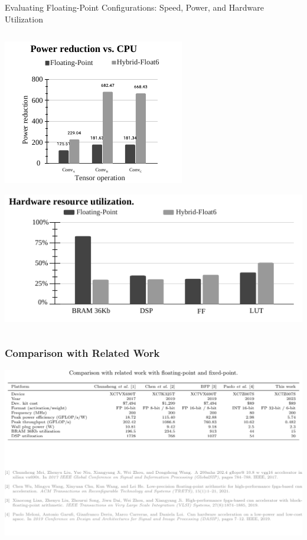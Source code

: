 \begin{frame}{Evaluating Floating-Point Configurations: Speed, Power, and Hardware Utilization}
\begin{columns}[T]
\begin{column}{0.5\textwidth}
			\includegraphics[width=0.5\linewidth]{slides/figures/power_reduction_vs_cpu.pdf} %
			\pause %
			
			\includegraphics[width=0.8\linewidth]{slides/figures/resource_utilization.pdf} %
		\end{column}
	\end{columns}
\end{frame}

\begin{frame}
	\frametitle{Comparison with Related Work} %
	\begin{center}
		\includegraphics[width=\textwidth]{slides/figures/cnn_related_work.pdf} %
	\end{center}
\end{frame}